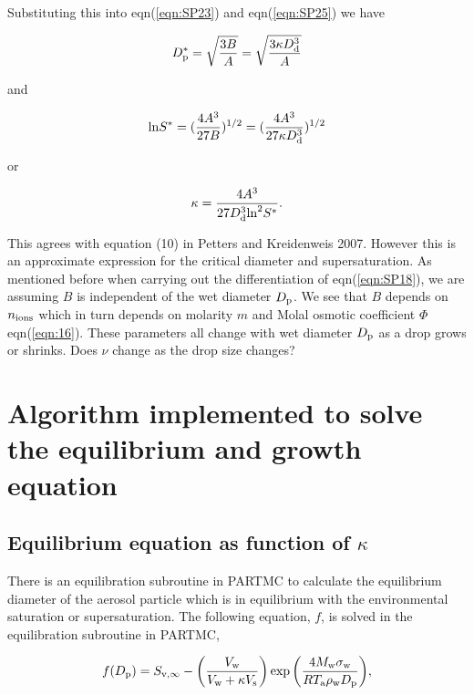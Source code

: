 \documentclass[12pt]{article}
\begin{document}
Substituting this into eqn(\ref{eqn:SP23}) and eqn(\ref{eqn:SP25})
we have 

\begin{equation}\label{eqn:27}
D_{\rm p}^{*}=\sqrt{\frac{3B}{A}}=\sqrt{\frac{3 \kappa D_{\rm d}^{3}}{A}}
\end{equation}

and

\begin{equation}\label{eqn:28}
{\rm ln}  S^{*}=(\frac{4A^{3}}{27B})^{1/2}=(\frac{4A^{3}}{27\kappa D_{\rm d}^{3} })^{1/2}
\end{equation}

or 

\begin{equation}\label{eqn:28}
\kappa=\frac{4A^{3}} {27D_{\rm d}^{3} {\rm ln}^{2} S^{*} }.
\end{equation}

This agrees with equation (10) in Petters and Kreidenweis 2007. However this is an approximate expression for the critical diameter and supersaturation. As mentioned before when carrying out the differentiation of eqn(\ref{eqn:SP18}), we are assuming $B$ is independent of the wet diameter $D_{\rm p}$. We see that $B$ depends on $n_{\rm ions}$ which in turn depends on molarity $m$ and Molal osmotic coefficient $\Phi$ eqn(\ref{eqn:16}). These parameters all change with wet diameter $D_{\rm p}$ as a drop grows or shrinks. 
Does $\nu$ change as the drop size changes?

\section{Algorithm implemented to solve the equilibrium and growth equation}

\subsection{Equilibrium equation as function of $\kappa$}

There is an equilibration subroutine in PARTMC to calculate the equilibrium diameter of the aerosol particle which is in equilibrium with the environmental saturation or supersaturation.
The following equation, $f$, is solved in the equilibration subroutine in PARTMC,


\begin{equation}\label{eqn:19a}
f(D_{\rm p})=S_{\rm v, \infty}-\left(\frac{V_{\rm w}}{V_{\rm w} + \kappa V_{\rm s}}\right)\exp{\left(\frac{4 M_{\rm w} \sigma_{\rm w}}{R T_{\rm a} \rho_{\rm w} D_{\rm p}}\right)},
\end{equation}
\end{document}

